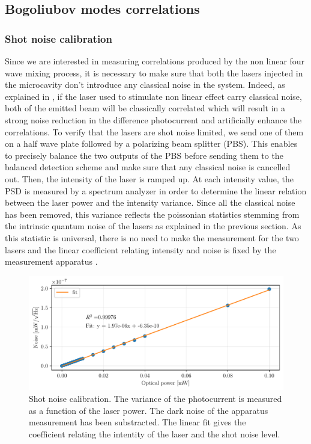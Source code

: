 \subsection{Bogoliubov modes correlations}
\label{sec:exp_corr}


\subsubsection{Shot noise calibration}
Since we are interested in measuring correlations produced by the non linear four wave mixing process, it is necessary to make sure that both the lasers
injected in the microcavity don't introduce any classical noise in the system. Indeed, as explained in \cite{treps_fabre_criteria_2004}, if the laser used to stimulate non linear effect carry classical noise, both of the emitted beam 
will be classically correlated which will result in a strong noise reduction in the difference photocurrent and artificially enhance the correlations.
To verify that the lasers are shot noise limited, we send one of them on a half wave plate followed by a polarizing beam splitter (PBS). This enables to precisely balance the two outputs of the PBS before sending them to the balanced detection scheme and make sure 
that any classical noise is cancelled out. Then, the intensity of the laser is ramped up. At each intensity value, the PSD is measured by a spectrum analyzer in order to determine the linear relation between 
the laser power and the intensity variance. Since all the classical noise has been removed, this variance reflects the poissonian statistics stemming from the intrinsic quantum noise of the lasers as explained in the previous section. As this statistic is universal,
there is no need to make the measurement for the two lasers and the linear coefficient relating intensity and noise is fixed by the measurement apparatus \cite{bachor_guide_1998}.

\begin{figure}
    \centering
    \includegraphics[width=1\textwidth]{chap_correlation/fig/noise_vs_optical_power.pdf}
    \caption{Shot noise calibration. The variance of the photocurrent is measured as a function of the laser power. The dark noise of the apparatus measurement has been substracted. The linear fit gives the coefficient relating the intentity of the laser and the shot noise level.}
    \label{fig:calibration}
\end{figure}

